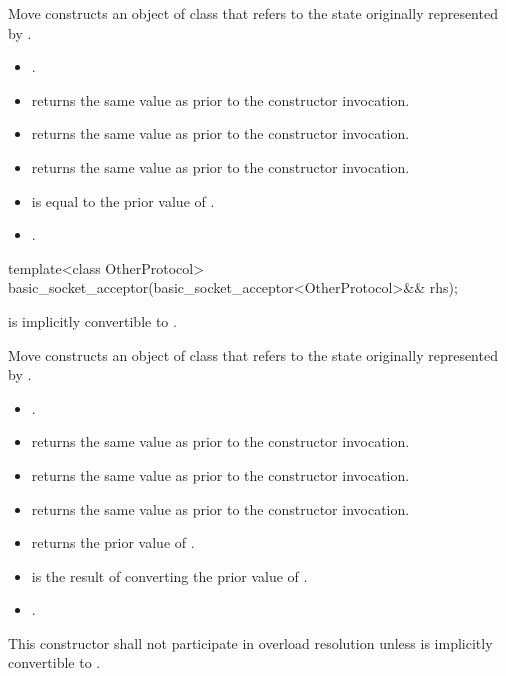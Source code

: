\begin{itemdescr}
\pnum
\effects Move constructs an object of class  that refers to the state originally represented by .

\pnum
\postconditions 
\begin{itemize}
\item
{}.
\item
{} returns the same value as  prior to the constructor invocation.
\item
{} returns the same value as  prior to the constructor invocation.
\item
{} returns the same value as  prior to the constructor invocation.
\item
{} is equal to the prior value of .
\item
{}.
\end{itemize}
\end{itemdescr}

\begin{itemdecl}
template<class OtherProtocol>
  basic_socket_acceptor(basic_socket_acceptor<OtherProtocol>&& rhs);
\end{itemdecl}

\begin{itemdescr}
\pnum
\requires {} is implicitly convertible to .

\pnum
\effects Move constructs an object of class  that refers to the state originally represented by .

\pnum
\postconditions 
\begin{itemize}
\item
{}.
\item
{} returns the same value as  prior to the constructor invocation.
\item
{} returns the same value as  prior to the constructor invocation.
\item
{} returns the same value as  prior to the constructor invocation.
\item
{} returns the prior value of .
\item
{} is the result of converting the prior value of .
\item
{}.
\end{itemize}

\pnum
\remarks This constructor shall not participate in overload resolution unless  is implicitly convertible to .
\end{itemdescr}



